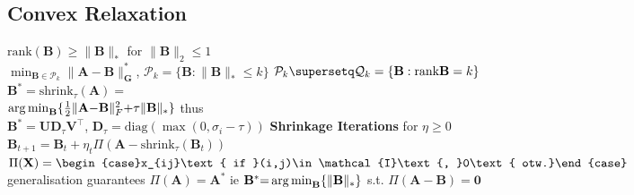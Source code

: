 \subsection*{Convex Relaxation}
$\text{rank}(\mathbf{B})\geq\|\mathbf{B}\|_*$ for $\|\mathbf{B}\|_2\leq1$\\
$\min_{\mathbf{B}\in\mathcal{P}_k}\|\mathbf{A}-\mathbf{B}\|_\mathbf{G}^*$, $\mathcal{P}_k=\{\mathbf{B}:\|\mathbf{B}\|_*\leq k\}$
$\mathcal{P}_k\supersetq\mathcal{Q}_k=\{\mathbf{B}:\text{rank}\mathbf{B}=k\}$\\
$\mathbf{B}^*{=}\text{shrink}_\tau(\mathbf{A}){=}$\\
$\operatorname*{arg\,min}_\mathbf{B}\{\frac{1}{2}\|\mathbf{A}{-}\mathbf{B}\|_F^2{+}\tau\|\mathbf{B}\|_*\}$ thus\\
$\mathbf{B}^*{=}\mathbf{U}\mathbf{D}_\tau\mathbf{V}^\top$,
$\mathbf{D}_\tau{=}\text{diag}(\max(0,\sigma_i{-}\tau))$
\textbf{Shrinkage Iterations} for $\eta\geq0$\\
$\mathbf{B}_{t+1}=\mathbf{B}_t{+}\eta_t\Pi(\mathbf{A}-\text{shrink}_\tau(\mathbf{B}_t))$\\
$\Pi(\mathbf{X})=\begin{case}x_{ij}\text{ if }(i,j)\in\mathcal{I}\text{,  }0\text{ otw.}\end{case}$\\
generalisation guarantees $\Pi(\mathbf{A})=\mathbf{A}^*$ ie $\mathbf{B}^*{=}\operatorname*{arg\,min}_{\mathbf{B}}\{\|\mathbf{B}\|_*\}$ s.t. $\Pi(\mathbf{A}{-}\mathbf{B}){=}\mathbf{0}$

